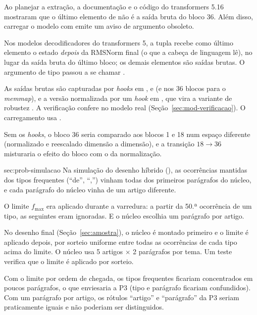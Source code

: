 {Ao planejar a extração, a documentação e o código do transformers 5.16 mostraram que o último
elemento de  não é a saída bruta do bloco 36. Além disso, carregar o modelo
com  emite um aviso de argumento obsoleto.}
{\item[Causa.] Nos modelos decodificadores do transformers 5, a tupla 
recebe como último elemento o estado \emph{depois} da RMSNorm final (o que a cabeça de
linguagem lê), no lugar da saída bruta do último bloco; os demais elementos são saídas brutas.
O argumento de tipo passou a se chamar .
\item[Solução.] As saídas brutas são capturadas por \emph{hooks} em ,
 e  (e nos 36 blocos para o \emph{memmap}), e a versão
normalizada por um \emph{hook} em , que vira a variante de robustez . A
verificação  confere  no modelo real
(Seção~\ref{sec:mod-verificacao}). O carregamento usa .}
{Sem os \emph{hooks}, o bloco 36 seria comparado aos blocos 1 e 18 num espaço diferente
(normalizado e reescalado dimensão a dimensão), e a transição $18\to36$ misturaria o efeito do
bloco com o da normalização.}

{sec:prob-simulacao}
{Na simulação do desenho híbrido (), as ocorrências mantidas dos tipos
frequentes (``de'', ``,'') vinham todas dos primeiros parágrafos do núcleo, e cada parágrafo do
núcleo vinha de um artigo diferente.}
{\item[Causa.] O limite $f_{\max}$ era aplicado durante a varredura: a partir da 50.ª ocorrência
de um tipo, as seguintes eram ignoradas. E o núcleo escolhia um parágrafo por artigo.
\item[Solução.] No desenho final (Seção~\ref{sec:amostra}), o núcleo é montado primeiro e o
limite é aplicado depois, por sorteio uniforme entre todas as ocorrências de cada tipo acima do
limite. O núcleo usa 5 artigos $\times$ 2 parágrafos por tema. Um teste verifica que o limite é
aplicado por sorteio.}
{Com o limite por ordem de chegada, os tipos frequentes ficariam concentrados em poucos
parágrafos, o que enviesaria a P3 (tipo e parágrafo ficariam confundidos). Com um parágrafo por
artigo, os rótulos ``artigo'' e ``parágrafo'' da P3 seriam praticamente iguais e não poderiam ser
distinguidos.}

